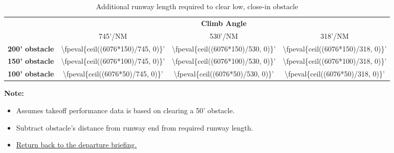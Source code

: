 {}

\begin{table}[H]
    \hypertarget{runway-length-table}{\caption{Additional runway length required to clear low, close-in obstacle}}

    \begin{center}
        \begin{tabular}{lccc}
            \toprule
                                   & \multicolumn{3}{c}{\textbf{Climb Angle}}
            \\\cmidrule(lr){2-4}
                                   & 745'/NM                                  & 530'/NM                                 & 318'/NM                                 \\
            \midrule
            \textbf{200' obstacle} & \num{\fpeval{ceil((6076*150)/745, 0)}}'  & \num{\fpeval{ceil((6076*150)/530, 0)}}' & \num{\fpeval{ceil((6076*150)/318, 0)}}' \\
            \textbf{150' obstacle} & \num{\fpeval{ceil((6076*100)/745, 0)}}'  & \num{\fpeval{ceil((6076*100)/530, 0)}}' & \num{\fpeval{ceil((6076*100)/318, 0)}}' \\
            \textbf{100' obstacle} & \num{\fpeval{ceil((6076*50)/745, 0)}}'   & \num{\fpeval{ceil((6076*50)/530, 0)}}'  & \num{\fpeval{ceil((6076*50)/318, 0)}}'  \\
            \bottomrule
        \end{tabular}
    \end{center}

    \textbf{Note:}
    \begin{itemize}
        \item Assumes takeoff performance data is based on clearing a 50' obstacle.
        \item Subtract obstacle's distance from runway end from required runway length.
        \item \hyperlink{departure-briefing}{Return back to the departure briefing.}
    \end{itemize}
\end{table}
